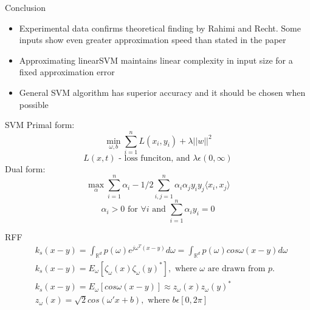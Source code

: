 \documentclass[unknownkeysallowed]{beamer}
\begin{document}
\begin{frame}{Conclusion}
\begin{itemize}
  \item Experimental data confirms theoretical finding by Rahimi and Recht. Some inputs show even greater approximation speed than stated in the paper
  \item Approximating linearSVM maintains linear complexity in input size for a fixed approximation error
  \item General SVM algorithm has superior accuracy and it should be chosen when possible
\end{itemize}

\end{frame}


\begin{frame}[noframenumbering]{SVM}
Primal form:
\begin{equation}
\min\limits_{\omega, b}\sum_{i=1}^n L(x_i, y_i) + \lambda ||w||^2
\end{equation}
\begin{equation}
L(x, t) \text{ - loss funciton, and } \lambda \epsilon (0, \infty)
\end{equation}
Dual form:
\begin{equation}\label{eq:dual}
\max\limits_{\alpha} \sum_{i=1}^n \alpha_i -1/2 \sum_{i,j=1}^n \alpha_i\alpha_j y_i y_j \langle x_i, x_j\rangle
\end{equation}
\begin{equation}\label{eq:dual}
\alpha_i > 0 \text{ for } \forall i \text{ and } \sum_{i=1}^n\alpha_i y_i=0
\end{equation}

\end{frame}

\begin{frame}[noframenumbering]{RFF}
\begin{equation}
\begin{aligned}
&k_s(x-y)=\int_{\mathbb{R}^d} p(\omega) e^{j\omega^T(x-y)} d\omega = \int_{\mathbb{R}^d} p(\omega) cos \omega(x-y) d\omega \\
&k_s(x-y)=E_\omega[\zeta_\omega(x)\zeta_\omega(y)^*], \text{ where } \omega \text{ are drawn from } p. \\
&k_s(x-y) =E_\omega[cos\omega(x-y)]\approx z_\omega(x)z_\omega(y)^*\\
&z_\omega(x)=\sqrt{2}cos(\omega'x+b), \text{ where } b\epsilon[0, 2\pi]
\end{aligned}
\end{equation}
\end{frame}
\end{document}
